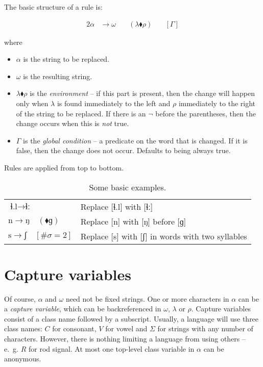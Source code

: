 \documentclass{book}
\begin{document}
The basic structure of a rule is:

\begin{alignat}{2}
  \alpha &\rightarrow \omega &\quad(\lambda \blacklozenge \rho) &\quad[\Gamma]
\end{alignat}

where

\begin{itemize}
  \item $\alpha$ is the string to be replaced.
  \item $\omega$ is the resulting string.
  \item $\lambda \blacklozenge \rho$ is the \emph{environment} -- if this part is present, then the change will happen only when $\lambda$ is found immediately to the left and $\rho$ immediately to the right of the string to be replaced. If there is an $\lnot$ before the parentheses, then the change occurs when this is \emph{not} true.
  \item $\Gamma$ is the \emph{global condition} -- a predicate on the word that is changed. If it is false, then the change does not occur. Defaults to being always true.
\end{itemize}

Rules are applied from top to bottom.

\begin{table}[h]
  \caption{Some basic examples.}
  \centering
  \begin{tabu} to \linewidth {|l|X|}
    \hline
    $\text{ɬ.l} \rightarrow \text{ɬː}$ & Replace [ɬ.l] with [ɬː] \\
    $\text{n} \rightarrow \text{ŋ} \quad(\blacklozenge \text{ɡ})$ & Replace [n] with [ŋ] before [ɡ] \\
    $\text{s} \rightarrow \text{ʃ} \quad[\#\sigma = 2]$ & Replace [s] with [ʃ] in words with two syllables \\
    \hline
  \end{tabu}
\end{table}

\section{Capture variables}

Of course, $\alpha$ and $\omega$ need not be fixed strings. One or more characters in $\alpha$ can be a \emph{capture variable}, which can be backreferenced in $\omega$, $\lambda$ or $\rho$. Capture variables consist of a class name followed by a subscript. Usually, a language will use three class names: $C$ for consonant, $V$ for vowel and $\Sigma$ for strings with any number of characters. However, there is nothing limiting a language from using others -- e.~g. $R$ for rod signal. At most one top-level class variable in $\alpha$ can be anonymous.
\end{document}
